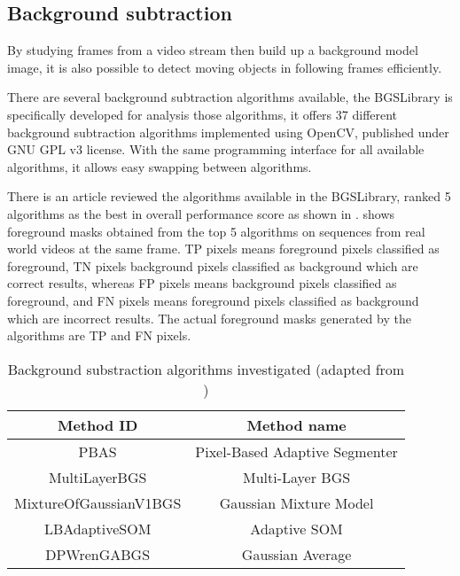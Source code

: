\subsection{Background subtraction}
\label{motion_bs}

By studying frames from a video stream then build up a background model image, it is also possible to detect moving objects in following frames efficiently.





There are several background subtraction algorithms available, the BGSLibrary \cite{bgslibrary} is specifically developed for analysis those algorithms, it offers 37 different background subtraction algorithms implemented using OpenCV, published under GNU GPL v3 license. With the same programming interface for all available algorithms, it allows easy swapping between algorithms.

There is an article \cite{bgs:article} reviewed the algorithms available in the BGSLibrary, ranked 5 algorithms as the best in overall performance score as shown in .  shows foreground masks obtained from the top 5 algorithms on sequences from real world videos at the same frame. TP pixels means foreground pixels classified as foreground, TN pixels background pixels classified as background which are correct results, whereas FP pixels means background pixels classified as foreground, and FN pixels means foreground pixels classified as background which are incorrect results. The actual foreground masks generated by the algorithms are TP and FN pixels.

\begin{table}[H]
  \centering
  \begin{tabular}{cc}
  \toprule
  \textbf{Method ID} & \textbf{Method name}\\
  \midrule
  PBAS & Pixel-Based Adaptive Segmenter \\
  MultiLayerBGS & Multi-Layer BGS \\
  MixtureOfGaussianV1BGS & Gaussian Mixture Model \\
  LBAdaptiveSOM & Adaptive SOM \\
  DPWrenGABGS & Gaussian Average \\
  \bottomrule
  \end{tabular}
  \caption{Background substraction algorithms investigated (adapted from \cite{bgslibrary})}
  \label{Table:bgs}
\end{table}

